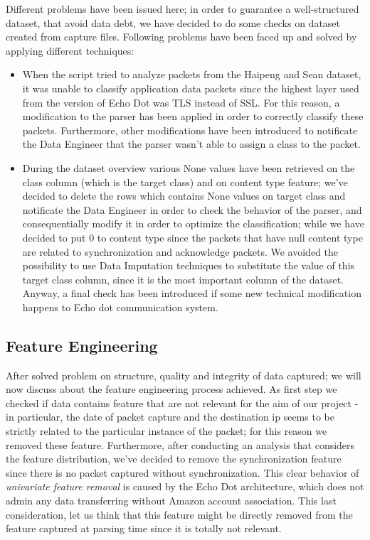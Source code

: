 \documentclass[sigconf]{acmart}
\begin{document}
Different problems have been issued here; in order to guarantee a well-structured dataset, that avoid data debt, we have decided to do some checks on dataset created from capture files.
Following problems have been faced up and solved by applying different techniques:
\begin{itemize}
\item When the script tried to analyze packets from the Haipeng and Sean dataset, it was unable to classify application data packets since the highest layer used from the version of Echo Dot was TLS instead of SSL. For this reason, a modification to the parser has been applied in order to correctly classify these packets. Furthermore, other modifications have been introduced to notificate the Data Engineer that the parser wasn't able to assign a class to the packet.
\item During the dataset overview various None values have been retrieved on the class column (which is the target class) and on content type feature; we've decided to delete the rows which contains None values on target class and notificate the Data Engineer in order to check the behavior of the parser, and consequentially modify it in order to optimize the classification; while we have decided to put 0 to content type since the packets that have null content type are related to synchronization and acknowledge packets. We avoided the possibility to use Data Imputation techniques to substitute the value of this target class column, since it is the most important column of the dataset.
Anyway, a final check has been introduced if some new technical modification happens to Echo dot communication system.
\end{itemize}
\subsection{Feature Engineering}
After solved problem on structure, quality and integrity of data captured; we will now discuss about the feature engineering process achieved. As first step we checked if data contains feature that are not relevant for the aim of our project - in particular, the date of packet capture and the destination ip seems to be strictly related to the particular instance of the packet; for this reason we removed these feature.
Furthermore, after conducting an analysis that considers the feature distribution, we've decided to remove the synchronization feature since there is no packet captured without synchronization. This clear behavior of \textit{univariate feature removal} is caused by the Echo Dot architecture, which does not admin any data transferring without Amazon account association. This last consideration, let us think that this feature might be directly removed from the feature captured at parsing time since it is totally not relevant.
\end{document}
